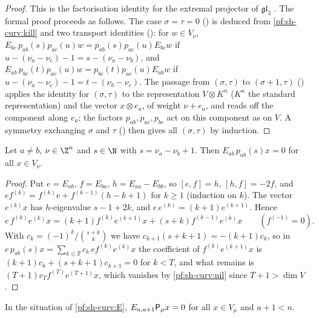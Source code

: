 \begin{proof}
This is the factorisation identity for the extremal projector of $\mathfrak{gl}_3$
\cite{AsherovaSmirnovTolstoy1971,Zhelobenko1989}. The formal proof proceeds as follows. The case $\sigma=\tau=0$
() is deduced from \cref{pf:sh-curv:kill} and two transport
identities (): for $w\in V_\nu$,
$E_{bc}\,p_{ab}(s)p_{ac}(u)w=p_{ab}(s)p_{ac}(u)E_{bc}w$ if $u-(\nu_a-\nu_c)-1=s-(\nu_a-\nu_b)$, and
$E_{ab}\,p_{bc}(t)p_{ac}(u)w=p_{bc}(t)p_{ac}(u)E_{ab}w$ if $u-(\nu_a-\nu_c)-1=t-(\nu_b-\nu_c)$. The passage from $(\sigma,\tau)$ to
$(\sigma+1,\tau)$ () applies the identity for $(\sigma,\tau)$ to
the representation $V\otimes K^n$ ($K^n$ the standard representation) and the vector $x\otimes e_a$, of weight
$\nu+e_a$, and reads off the component along $e_a$; the factors $p_{ab},p_{ac},p_{bc}$ act on this component as on $V$. A
symmetry exchanging $\sigma$ and $\tau$ () then gives all
$(\sigma,\tau)$ by induction.
\end{proof}

\begin{lemma}\label{pf:sh-curv:kill}
Let $a\ne b$, $\nu\in\Z^n$ and $s\in\N$ with $s=\nu_a-\nu_b+1$. Then $E_{ab}\,p_{ab}(s)x=0$ for all $x\in V_\nu$.
\end{lemma}

\begin{proof}
Put $e=E_{ab}$, $f=E_{ba}$, $h=E_{aa}-E_{bb}$, so $[e,f]=h$, $[h,f]=-2f$, and $e f^{(k)}=f^{(k)}e+f^{(k-1)}(h-k+1)$ for $k\ge1$
(induction on $k$). The vector $e^{(k)}x$ has $h$-eigenvalue $s-1+2k$, and $e\,e^{(k)}=(k+1)e^{(k+1)}$. Hence
\[
e\,f^{(k)}e^{(k)}x=(k+1)f^{(k)}e^{(k+1)}x+(s+k)f^{(k-1)}e^{(k)}x\qquad(f^{(-1)}=0).
\]
With $c_k=(-1)^k/\binom{s+k}{k}$ we have $c_{k+1}(s+k+1)=-(k+1)c_k$, so in $e\,p_{ab}(s)x=\sum_{k\le T}c_k\,e
f^{(k)}e^{(k)}x$ the coefficient of $f^{(k)}e^{(k+1)}x$ is $(k+1)c_k+(s+k+1)c_{k+1}=0$ for $k<T$, and what remains is
$(T+1)c_Tf^{(T)}e^{(T+1)}x$, which vanishes by \cref{pf:sh-curv:nil} since $T+1>\dim V$.
\end{proof}

\begin{proposition}\label{pf:sh-curv:simplekill}
In the situation of \cref{pf:sh-curv:E}, $E_{a,a+1}\mathsf P_\mu x=0$ for all $x\in V_\mu$ and $a+1<n$.
\end{proposition}

